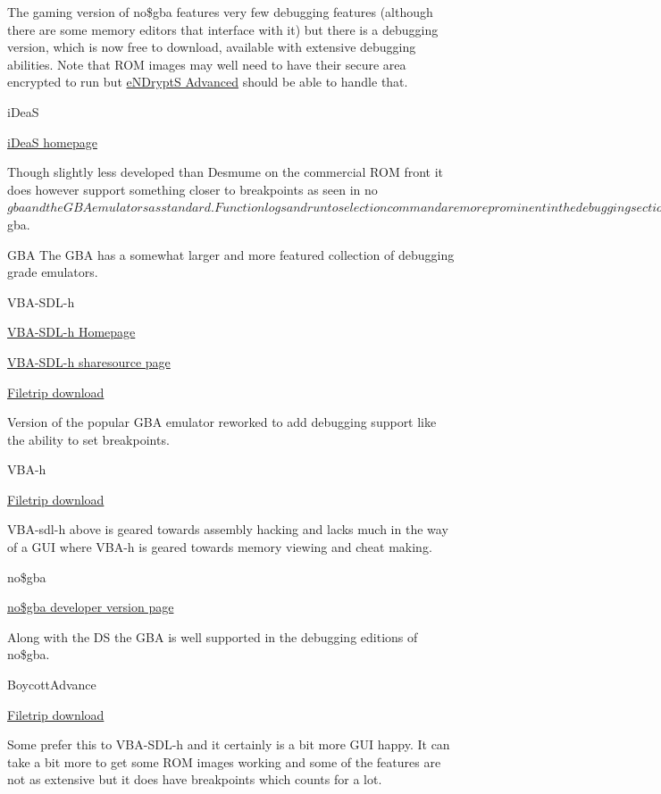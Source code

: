 \documentclass[
]{book}
\begin{document}
The gaming version of no\$gba features very few debugging features (although there are some memory editors that interface with it) but there is a debugging version, which is now free to download, available with extensive debugging abilities. Note that ROM images may well need to have their secure area encrypted to run but \href{http://www.no-intro.org/tools.htm}{eNDryptS Advanced} should be able to handle that.

iDeaS

\href{http://ciacin.site90.com/ideas.php}{iDeaS homepage}

Though slightly less developed than Desmume on the commercial ROM front it does however support something closer to breakpoints as seen in no\(gba and the GBA emulators as standard. Function logs and run to selection command are more prominent in the debugging section though and it is not quite a full replacement for no\)gba.

GBA The GBA has a somewhat larger and more featured collection of debugging grade emulators.

VBA-SDL-h

\href{http://labmaster.bios.net.nz/vba-sdl-h/}{VBA-SDL-h Homepage}

\href{http://sharesource.org/project/vbasdlh/}{VBA-SDL-h sharesource page}

\href{http://filetrip.net/gba-downloads/emulators/download-vba-sdl-h-r070904a-f28914.html}{Filetrip download}

Version of the popular GBA emulator reworked to add debugging support like the ability to set breakpoints.

VBA-h

\href{http://filetrip.net/gba-downloads/emulators/download-vba-h-172-f28913.html}{Filetrip download}

VBA-sdl-h above is geared towards assembly hacking and lacks much in the way of a GUI where VBA-h is geared towards memory viewing and cheat making.

no\$gba

\href{http://problemkaputt.de/gba-dev.htm}{no\$gba developer version page}

Along with the DS the GBA is well supported in the debugging editions of no\$gba.

BoycottAdvance

\href{http://filetrip.net/gba-downloads/emulators/download-boycottadvance-028-windows-f28912.html}{Filetrip download}

Some prefer this to VBA-SDL-h and it certainly is a bit more GUI happy. It can take a bit more to get some ROM images working and some of the features are not as extensive but it does have breakpoints which counts for a lot.
\end{document}
